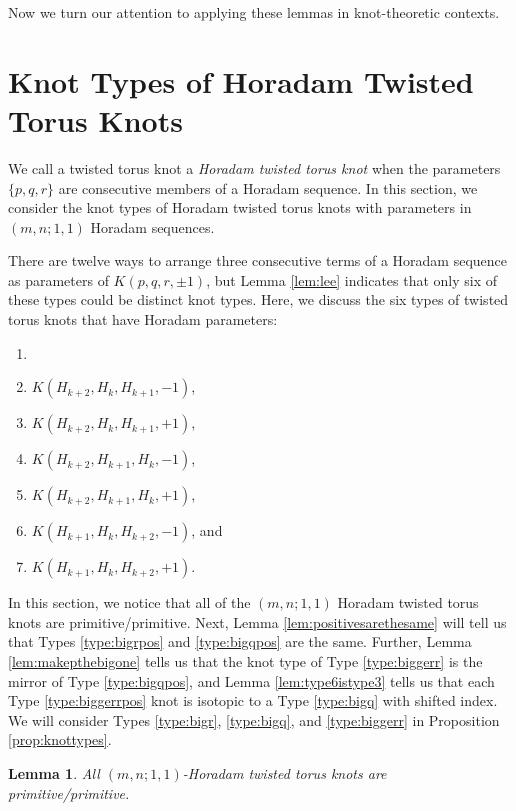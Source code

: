 \documentclass{amsart}
\newtheorem{lemma}{Lemma}
\begin{document}
Now we turn our attention to applying these lemmas in knot-theoretic contexts.

\section{Knot Types of Horadam Twisted Torus Knots}\label{HTTKs}

We call a twisted torus knot a \textit{Horadam twisted torus knot} when the parameters $\{p,q,r\}$ are consecutive members of a Horadam sequence.
In this section, we consider the knot types of Horadam twisted torus knots with parameters in $(m,n; 1,1)$ Horadam sequences.

There are twelve ways to arrange three consecutive terms of a Horadam sequence as parameters of $K(p,q,r,\pm 1)$, but Lemma \ref{lem:lee} indicates that only six of these types could be distinct knot types. Here, we discuss the six types of twisted torus knots that have Horadam parameters: \begin{enumerate}
\item[]
\item \label{type:bigr} $K(H_{k+2}, H_k, H_{k+1}, -1)$, 
\item \label{type:bigrpos} $K(H_{k+2}, H_k, H_{k+1}, +1)$, 
\item \label{type:bigq} $K(H_{k+2}, H_{k+1}, H_{k}, -1)$,
\item \label{type:bigqpos} $K(H_{k+2}, H_{k+1}, H_{k}, +1)$,
\item \label{type:biggerr}$K(H_{k+1}, H_k, H_{k+2}, -1)$, and
\item \label{type:biggerrpos}$K(H_{k+1}, H_k, H_{k+2}, +1)$.
\end{enumerate} 

In this section, we notice that all of the $(m,n;1,1)$ Horadam twisted torus knots are primitive/primitive. Next, Lemma \ref{lem:positivesarethesame} will tell us that Types \ref{type:bigrpos} and \ref{type:bigqpos} are the same. Further, Lemma \ref{lem:makepthebigone} tells us that the knot type of Type \ref{type:biggerr} is the mirror of Type \ref{type:bigqpos}, and Lemma \ref{lem:type6istype3} tells us that each Type \ref{type:biggerrpos} knot is isotopic to a Type \ref{type:bigq} with shifted index. We will consider Types \ref{type:bigr}, \ref{type:bigq}, and \ref{type:biggerr} in Proposition \ref{prop:knottypes}. 

\begin{lemma}\label{lem:primprim}
All $(m,n;1,1)$-Horadam twisted torus knots are primitive/primitive.
\end{lemma}
\end{document}
